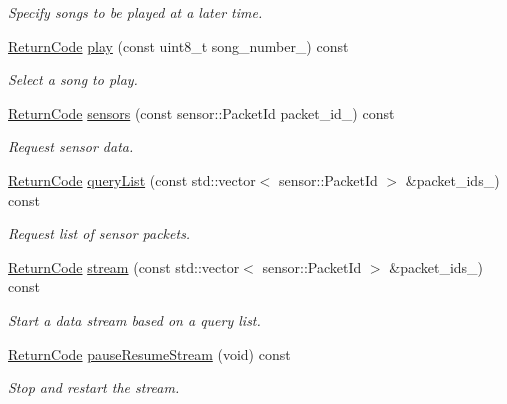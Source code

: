 \begin{DoxyCompactItemize}
\begin{DoxyCompactList}\small\item\em Specify songs to be played at a later time. \end{DoxyCompactList}\item 
\hyperlink{classroomba_1_1series500_1_1_open_interface_a43fc2ae1216e57cfb46901331b9ab4c7}{Return\+Code} \hyperlink{classroomba_1_1series500_1_1_open_interface_a89c1c582ee1254d283fdb3ebbeb6ba67}{play} (const uint8\+\_\+t song\+\_\+number\+\_\+) const 
\begin{DoxyCompactList}\small\item\em Select a song to play. \end{DoxyCompactList}\item 
\hyperlink{classroomba_1_1series500_1_1_open_interface_a43fc2ae1216e57cfb46901331b9ab4c7}{Return\+Code} \hyperlink{classroomba_1_1series500_1_1_open_interface_af7b042d7919548d8feae666f097e3392}{sensors} (const sensor\+::\+Packet\+Id packet\+\_\+id\+\_\+) const 
\begin{DoxyCompactList}\small\item\em Request sensor data. \end{DoxyCompactList}\item 
\hyperlink{classroomba_1_1series500_1_1_open_interface_a43fc2ae1216e57cfb46901331b9ab4c7}{Return\+Code} \hyperlink{classroomba_1_1series500_1_1_open_interface_a1a1f69be99bb2833580bddcaa60bf15a}{query\+List} (const std\+::vector$<$ sensor\+::\+Packet\+Id $>$ \&packet\+\_\+ids\+\_\+) const 
\begin{DoxyCompactList}\small\item\em Request list of sensor packets. \end{DoxyCompactList}\item 
\hyperlink{classroomba_1_1series500_1_1_open_interface_a43fc2ae1216e57cfb46901331b9ab4c7}{Return\+Code} \hyperlink{classroomba_1_1series500_1_1_open_interface_a902485dee6502c9f89627ae824c5b1d1}{stream} (const std\+::vector$<$ sensor\+::\+Packet\+Id $>$ \&packet\+\_\+ids\+\_\+) const 
\begin{DoxyCompactList}\small\item\em Start a data stream based on a query list. \end{DoxyCompactList}\item 
\hyperlink{classroomba_1_1series500_1_1_open_interface_a43fc2ae1216e57cfb46901331b9ab4c7}{Return\+Code} \hyperlink{classroomba_1_1series500_1_1_open_interface_a610783954ac02c9a6ee349e864143554}{pause\+Resume\+Stream} (void) const 
\begin{DoxyCompactList}\small\item\em Stop and restart the stream. \end{DoxyCompactList}\end{DoxyCompactItemize}
